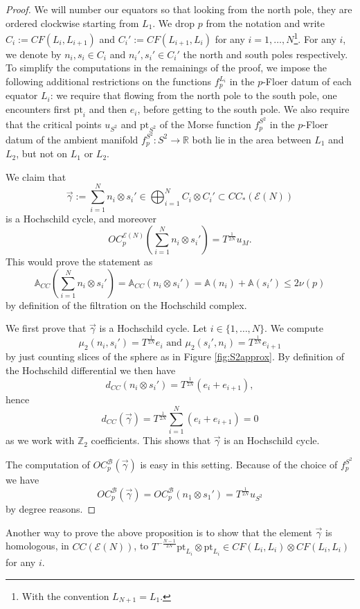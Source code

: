 \begin{rem}
\begin{proof}
	We will number our equators so that looking from the north pole, they are ordered clockwise starting from $L_1$. We drop $p$ from the notation and write $C_i:=CF(L_{i},L_{i+1})$ and $C_i':= CF(L_{i+1},L_i)$ for any $i=1,\ldots, N$\footnote{With the convention $L_{N+1}=L_1$.}. For any $i$, we denote by $n_i, s_i \in C_i$  and $n_i',s_i'\in C_i'$ the north and south poles respectively. To simplify the computations in the remainings of the proof, we impose the following additional restrictions on the functions $f^{L_i}_p$ in the $p$-Floer datum of each equator $L_i$: we require that flowing from the north pole to the south pole, one encounters first $\text{pt}_i$ and then $e_i$, before getting to the south pole. We also require that the critical points $u_{S^2}$ and $\text{pt}_{S^2}$ of the Morse function $f^{S^2}_p$ in the $p$-Floer datum of the ambient manifold $f_p^{S^2}\colon S^2\to \mathbb{R}$ both lie in the area between $L_1$ and $L_2$, but not on $L_1$ or $L_2$.
	
	We claim that $$\vec{\gamma}:=\sum_{i=1}^N n_i\otimes s_i'\in \bigoplus_{i=1}^N C_i\otimes C_i'\subset CC_*(\mathcal{E}(N))$$ is a Hochschild cycle, and moreover $$OC_p^{\mathcal{E}(N)}\left(\sum_{i=1}^N n_i\otimes s_i'\right)=T^{\frac{1}{2N}}u_M.$$ This would prove the statement as $$\mathbb{A}_{CC}\left(\sum_{i=1}^N n_i\otimes s_i'\right) = \mathbb{A}_{CC}(n_i\otimes s_i') = \mathbb{A}(n_i)+\mathbb{A}(s_i')\leq 2\nu(p)$$ by definition of the filtration on the Hochschild complex.
	
	We first prove that $\vec{\gamma}$ is a Hochschild cycle. Let $i\in\{1,\ldots, N\}$. We compute $$\mu_2(n_i,s_i') = T^{\frac{1}{2N}}e_i \text{  and  } \mu_2(s_i',n_i) = T^{\frac{1}{2N}}e_{i+1}$$ by just counting slices of the sphere as in Figure \ref{fig:S2approx}. By definition of the Hochschild differential we then have $$d_{CC}(n_i\otimes s_i')=T^{\frac{1}{2N}}(e_i+e_{i+1}),$$ hence $$d_{CC}(\vec{\gamma}) = T^{\frac{1}{2N}}\sum_{i=1}^N \left(e_i+e_{i+1}\right) = 0$$ as we work with $\mathbb{Z}_2$ coefficients. This shows that $\vec{\gamma}$ is an Hochschild cycle.
	
	The computation of $OC_p^{\mathcal{B}}(\vec{\gamma})$ is easy in this setting. Because of the choice of $f^{S^2}_p$ we have $$OC_p^\mathcal{B}(\vec{\gamma}) = OC_p^\mathcal{B}(n_1\otimes s_1') = T^{\frac{1}{2N}}u_{S^2}$$ by degree reasons.
\end{proof}

	Another way to prove the above proposition is to show that the element $\vec{\gamma}$ is homologous, in $CC(\mathcal{E}(N))$, to $T^{-\frac{N-1}{2N}}\text{pt}_{L_i}\otimes \text{pt}_{L_i}\in CF(L_i,L_i)\otimes CF(L_i,L_i)$ for any $i$.
\end{rem}


